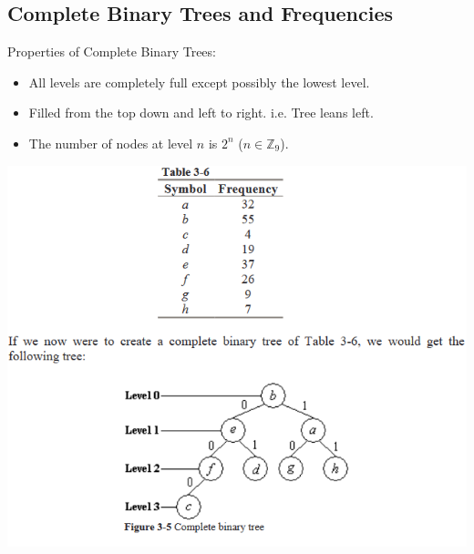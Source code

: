 \documentclass{beamer}
\begin{document}
\subsection{Complete Binary Trees and Frequencies}
\begin{frame}
Properties of Complete Binary Trees:
\begin{itemize}
\item All levels are completely full except possibly the lowest level.
\item Filled from the top down and left to right. i.e. Tree leans left.
\item The number of nodes at level $n$ is $2^n$ ($n \in \mathbb{Z}_9$).
\end{itemize}
\end{frame}

\begin{frame}
\begin{center}
\includegraphics[scale=0.55]{example}
\end{center}
\end{frame}
\end{document}

